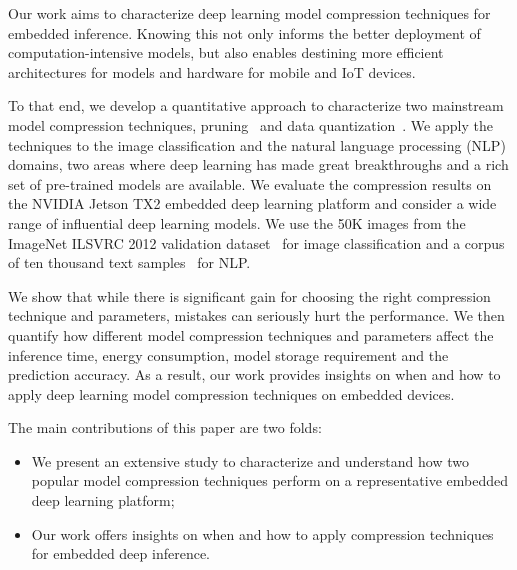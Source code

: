 Our work aims to characterize deep learning model compression techniques for embedded inference. Knowing this not only informs the better
deployment of computation-intensive models, but also enables destining more efficient architectures for models and hardware for mobile and
IoT devices.

To that end, we develop a quantitative approach  to characterize two mainstream model compression techniques,
pruning~\cite{Cheng2017A} and data quantization~\cite{Gong2014Compressing}. We apply the techniques to the image
classification and the natural language processing (NLP) domains, two areas where deep learning has made great breakthroughs and a rich set
of pre-trained models are available. We evaluate the compression results on the NVIDIA Jetson TX2 embedded deep learning platform and
consider a wide range of influential deep learning models. We use the 50K images from the ImageNet ILSVRC 2012 validation
dataset~\cite{imagenet2012} for image classification and a corpus of ten thousand text samples~\cite{acl2016} for NLP.


We show that while there is significant gain for choosing the right compression technique and parameters, mistakes can seriously hurt the
performance. We then quantify how different model compression techniques and parameters affect the inference time, energy consumption,
model storage requirement and the prediction accuracy. As a result, our work provides insights on when and how to apply deep learning model
compression techniques on embedded devices.

The main contributions of this paper are two folds:

\begin{itemize}
\item We present an extensive study to characterize and understand how two popular model compression techniques perform on a
    representative embedded deep learning platform;
\item Our work offers insights on when and how to apply compression techniques for embedded deep inference.
\end{itemize}
